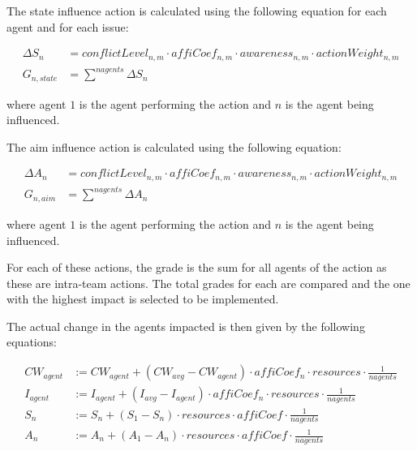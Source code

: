 \begin{itemize}
The state influence action is calculated using the following equation for each agent and for each issue:


\begin{equation} \begin{split}
\Delta S_{n} &=  conflictLevel_{n,m} \cdot affiCoef_{n,m} \cdot awareness_{n,m} \cdot actionWeight_{n,m} \\
 G_{n,state} &= \sum^{nagents}  \Delta S_{n}
\end{split} \end{equation}


where agent $1$ is the agent performing the action and $n$ is the agent being influenced.


The aim influence action is calculated using the following equation:


\begin{equation} \begin{split}
\Delta A_{n} &= conflictLevel_{n,m} \cdot affiCoef_{n,m} \cdot awareness_{n,m} \cdot actionWeight_{n,m} \\
 G_{n,aim} &= \sum^{nagents}  \Delta A_{n}
\end{split}
\end{equation}


where agent $1$ is the agent performing the action and $n$ is the agent being influenced.


For each of these actions, the grade is the sum for all agents of the action as these are intra-team actions. The total grades for each are compared and the one with the highest impact is selected to be implemented.


The actual change in the agents impacted is then given by the following equations:


\begin{equation} \begin{split}
CW_{agent} &:= CW_{agent} +  \left(CW_{avg} - CW_{agent} \right) \cdot affiCoef_n \cdot resources \cdot \frac{1}{nagents} \\
I_{agent} &:= I_{agent} +  \left(I_{avg} - I_{agent} \right) \cdot affiCoef_n \cdot resources \cdot \frac{1}{nagents} \\
S_{n} &:= S_{n} + \left(S_{1} - S_{n} \right) \cdot resources \cdot affiCoef \cdot \frac{1}{nagents} \\
A_{n} &:= A_{n} + \left(A_{1} - A_{n} \right) \cdot resources \cdot affiCoef \cdot \frac{1}{nagents} \\
\end{split}\end{equation}





\end{itemize}
